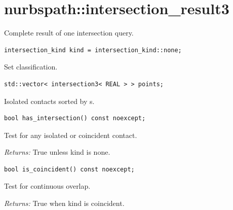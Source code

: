 \section{nurbspath::intersection\_result3}
Complete result of one intersection query.
\par\noindent\begin{minipage}{\linewidth}
\begin{lstlisting}[style=apireference]
intersection_kind kind = intersection_kind::none;
\end{lstlisting}
{\footnotesize Set classification.\par}
\end{minipage}\par\vspace{1pt}
\par\noindent\begin{minipage}{\linewidth}
\begin{lstlisting}[style=apireference]
std::vector< intersection3< REAL > > points;
\end{lstlisting}
{\footnotesize Isolated contacts sorted by s.\par}
\end{minipage}\par\vspace{1pt}
\par\noindent\begin{minipage}{\linewidth}
\begin{lstlisting}[style=apireference]
bool has_intersection() const noexcept;
\end{lstlisting}
{\footnotesize Test for any isolated or coincident contact.\par}
{\footnotesize\textit{Returns:} True unless kind is none.\par}
\end{minipage}\par\vspace{1pt}
\par\noindent\begin{minipage}{\linewidth}
\begin{lstlisting}[style=apireference]
bool is_coincident() const noexcept;
\end{lstlisting}
{\footnotesize Test for continuous overlap.\par}
{\footnotesize\textit{Returns:} True when kind is coincident.\par}
\end{minipage}\par\vspace{1pt}
